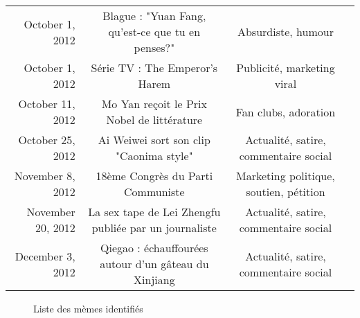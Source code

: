 \begin{landscape}
\begin{table}
\begin{tabulary}{\linewidth}{ r| C C C}
            October 1, 2012 & 
            Blague : "Yuan Fang, qu'est-ce que tu en penses?"  & 
            Absurdiste, humour & 
             \\

            October 1, 2012 &
            Série TV : The Emperor's Harem & 
            Publicité, marketing viral &
             \\

            October 11, 2012  &
            Mo Yan reçoit le Prix Nobel de littérature &
            Fan clubs, adoration  &
             \\

            October 25, 2012 &
            Ai Weiwei sort son clip "Caonima style"&
            Actualité, satire, commentaire social &
            \\

            November 8, 2012 &
            18ème Congrès du Parti Communiste &
            Marketing politique, soutien, pétition &
            \\

            November 20, 2012 &
            La sex tape de Lei Zhengfu publiée par un journaliste &
            Actualité, satire, commentaire social &
            \\

            December 3, 2012  &
            Qiegao : échauffourées autour d'un gâteau du Xinjiang &
            Actualité, satire, commentaire social &
            \\

        \end{tabulary}
    \end{table}
    \begin{figure}
        \caption[Liste des mèmes identifiés]{Liste des mèmes identifiés}
        \label{fig:memelist}
    \end{figure}
\end{landscape}